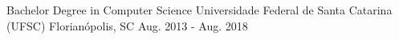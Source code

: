 

\begin{cventries}

  \cventry
    {Bachelor Degree in Computer Science} %
    {Universidade Federal de Santa Catarina (UFSC)} %
    {Florianópolis, SC} %
    {Aug. 2013 - Aug. 2018} %
    {}


\end{cventries}
